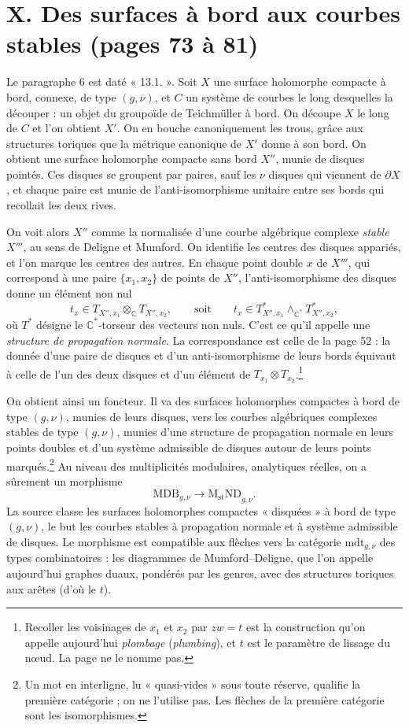 \documentclass[11pt,a4paper]{article}
\begin{document}
\section*{X. Des surfaces à bord aux courbes stables (pages 73 à 81)}

Le paragraphe 6 est daté « 13.1. ». Soit $X$ une surface holomorphe compacte à
bord, connexe, de type $(g,\nu)$, et $C$ un système de courbes le long
desquelles la découper : un objet du groupoïde de Teichmüller à bord. On
découpe $X$ le long de $C$ et l'on obtient $X'$. On en bouche canoniquement
les trous, grâce aux structures toriques que la métrique canonique de $X'$
donne à son bord. On obtient une surface holomorphe compacte sans bord $X''$,
munie de disques pointés. Ces disques se groupent par paires, sauf les $\nu$
disques qui viennent de $\partial X$, et chaque paire est munie de
l'anti-isomorphisme unitaire entre ses bords qui recollait les deux rives.

On voit alors $X''$ comme la normalisée d'une courbe algébrique complexe
\emph{stable} $X'''$, au sens de Deligne et Mumford. On identifie les centres
des disques appariés, et l'on marque les centres des autres. En chaque point
double $x$ de $X'''$, qui correspond à une paire $\{x_1, x_2\}$ de points de
$X''$, l'anti-isomorphisme des disques donne un élément non nul
\[
t_x \in T_{X'',x_1} \otimes_{\mathbb{C}} T_{X'',x_2},
\qquad\text{soit}\qquad
t_x \in T^{*}_{X'',x_1} \wedge_{\mathbb{C}^{*}} T^{*}_{X'',x_2},
\]
où $T^{*}$ désigne le $\mathbb{C}^{*}$-torseur des vecteurs non nuls. C'est
ce qu'il appelle une \emph{structure de propagation normale}. La
correspondance est celle de la page 52 : la donnée d'une paire de disques et
d'un anti-isomorphisme de leurs bords équivaut à celle de l'un des deux
disques et d'un élément de $T_{x_1} \otimes T_{x_2}$.\footnote{Recoller les
voisinages de $x_1$ et $x_2$ par $zw = t$ est la construction qu'on appelle
aujourd'hui \emph{plombage} (\emph{plumbing}), et $t$ est le paramètre de
lissage du nœud. La page ne le nomme pas.}

On obtient ainsi un foncteur. Il va des surfaces holomorphes compactes à bord
de type $(g,\nu)$, munies de leurs disques, vers les courbes algébriques
complexes stables de type $(g,\nu)$, munies d'une structure de propagation
normale en leurs points doubles et d'un système admissible de disques autour
de leurs points marqués.\footnote{Un mot en interligne, lu « quasi-vides »
sous toute réserve, qualifie la première catégorie ; on ne l'utilise pas. Les
flèches de la première catégorie sont les isomorphismes.} Au niveau des
multiplicités modulaires, analytiques réelles, on a sûrement un morphisme
\[
\mathrm{MDB}_{g,\nu} \longrightarrow \mathrm{M_{st}ND}_{g,\nu}.
\]
La source classe les surfaces holomorphes compactes « disquées » à bord de
type $(g,\nu)$, le but les courbes stables à propagation normale et à
système admissible de disques. Le morphisme est compatible aux flèches vers la
catégorie $\mathrm{mdt}_{g,\nu}$ des types combinatoires : les diagrammes de
Mumford--Deligne, que l'on appelle aujourd'hui graphes duaux, pondérés par les
genres, avec des structures toriques aux arêtes (d'où le $t$).
\end{document}
